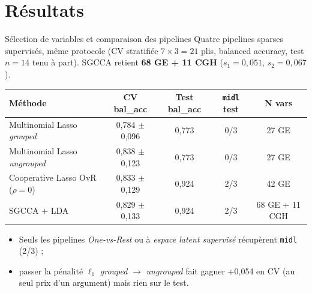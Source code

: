 \documentclass[aspectratio=169, 10pt]{beamer}
\begin{document}
\section{Résultats}

\begin{frame}{Sélection de variables et comparaison des pipelines}
  Quatre pipelines sparses supervisés, même protocole (CV stratifiée $7 \times 3 = 21$ plis, balanced accuracy, test $n = 14$ tenu à part). SGCCA retient \textbf{68 GE + 11 CGH} ($s_1 = 0{,}051$, $s_2 = 0{,}067$).

  \medskip
  \begin{center}
    \small
    \begin{tabular}{lcccc}
      \toprule
      \textbf{Méthode}                     & \textbf{CV bal\_acc} & \textbf{Test bal\_acc} & \texttt{\textbf{midl}} \textbf{test} & \textbf{N vars} \\
      \midrule
      Multinomial Lasso \textit{grouped}   & 0,784 $\pm$ 0,096    & 0,773                  & 0/3                                  & 27 GE           \\
      Multinomial Lasso \textit{ungrouped} & 0,838 $\pm$ 0,123    & 0,773                  & 0/3                                  & 27 GE           \\
      \rowcolor{boxgreen}
      Cooperative Lasso OvR ($\rho = 0$)   & 0,833 $\pm$ 0,129    & 0,924                  & 2/3                                  & 42 GE           \\
      \rowcolor{boxgreen}
      SGCCA + LDA                          & 0,829 $\pm$ 0,133    & 0,924                  & 2/3                                  & 68 GE + 11 CGH  \\
      \bottomrule
    \end{tabular}
  \end{center}

  \bigskip
  \begin{itemize}
    \item Seuls les pipelines \textit{One-vs-Rest} ou à \textit{espace latent supervisé} récupèrent \texttt{midl} (2/3) ;
    \item passer la pénalité $\ell_1$ \textit{grouped} $\to$ \textit{ungrouped} fait gagner +0,054 en CV (au seul prix d’un argument) mais rien sur le test.
  \end{itemize}
\end{frame}
\end{document}
